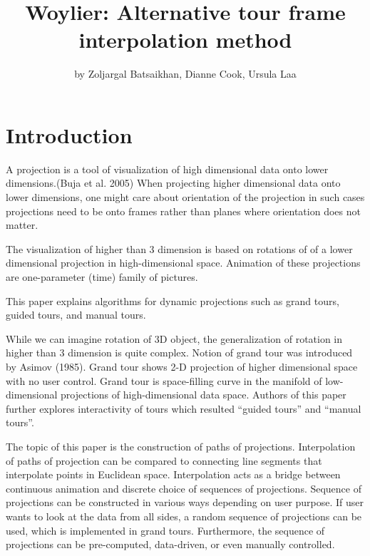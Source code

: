 \title{Woylier: Alternative tour frame interpolation method}
\author{by Zoljargal Batsaikhan, Dianne Cook, Ursula Laa}

\maketitle


\hypertarget{introduction}{%
\section{Introduction}\label{introduction}}

A projection is a tool of visualization of high dimensional data onto lower dimensions.(Buja et al. 2005) When projecting higher dimensional data onto lower dimensions, one might care about orientation of the projection in such cases projections need to be onto frames rather than planes where orientation does not matter.

The visualization of higher than 3 dimension is based on rotations of of a lower dimensional projection in high-dimensional space. Animation of these projections are one-parameter (time) family of pictures.

This paper explains algorithms for dynamic projections such as grand tours, guided tours, and manual tours.

While we can imagine rotation of 3D object, the generalization of rotation in higher than 3 dimension is quite complex. Notion of grand tour was introduced by Asimov (1985). Grand tour shows 2-D projection of higher dimensional space with no user control. Grand tour is space-filling curve in the manifold of low-dimensional projections of high-dimensional data space. Authors of this paper further explores interactivity of tours which resulted ``guided tours'' and ``manual tours''.

The topic of this paper is the construction of paths of projections. Interpolation of paths of projection can be compared to connecting line segments that interpolate points in Euclidean space. Interpolation acts as a bridge between continuous animation and discrete choice of sequences of projections. Sequence of projections can be constructed in various ways depending on user purpose. If user wants to look at the data from all sides, a random sequence of projections can be used, which is implemented in grand tours. Furthermore, the sequence of projections can be pre-computed, data-driven, or even manually controlled.

